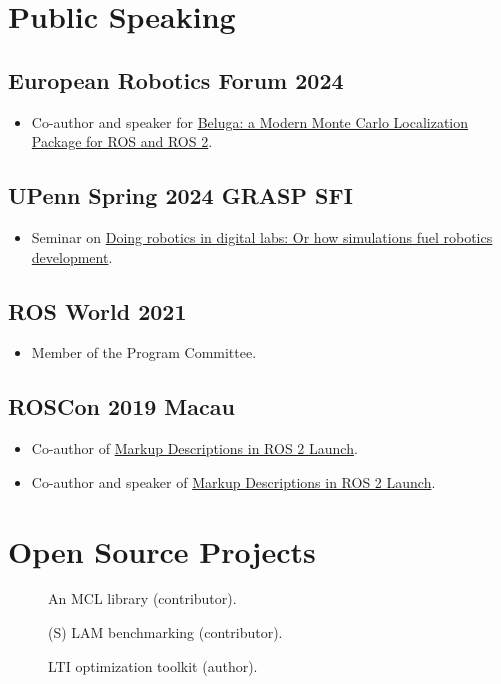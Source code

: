 \documentclass[english, letterpaper]{resume}
\begin{document}
\noindent\begin{minipage}[t]{0.475\linewidth}
  \section*{Public Speaking}
  \subsection*[\icon{erf}]{European Robotics Forum 2024}
  \begin{itemize}
    \item Co-author and speaker for \href{https://link.springer.com/chapter/10.1007/978-3-031-76424-0_23}{Beluga: a Modern Monte Carlo Localization Package for ROS and ROS 2}.
  \end{itemize}
  \subsection*[\icon{upenn}]{UPenn Spring 2024 GRASP SFI}
  \begin{itemize}
    \item Seminar on \href{https://www.grasp.upenn.edu/events/spring-2024-grasp-sfi-michel-hidalgo}{Doing robotics in digital labs: Or how simulations fuel robotics development}.
  \end{itemize}
  \subsection*[\icon{ros}]{ROS World 2021}
  \begin{itemize}
     \item Member of the Program Committee.
  \end{itemize}
  \subsection*[\icon{ros}]{ROSCon 2019 Macau}
  \begin{itemize}
    \item Co-author of \href{https://roscon.ros.org/2019/talks/roscon2019_markupextensionsforros2launch.pdf}{Markup Descriptions in ROS 2 Launch}.
    \item Co-author and speaker of \href{https://roscon.ros.org/2019/talks/roscon2019_markupextensionsforros2launch.pdf}{Markup Descriptions in ROS 2 Launch}.
  \end{itemize}
\end{minipage}\hfill
\begin{minipage}[t]{0.475\linewidth}
  \section*{Open Source Projects}
  \begin{description}
    \item[] An MCL library (contributor).
    \item[] (S) LAM benchmarking (contributor).
    \item[] LTI optimization toolkit (author).
  \end{description}
\end{minipage}
\end{document}
